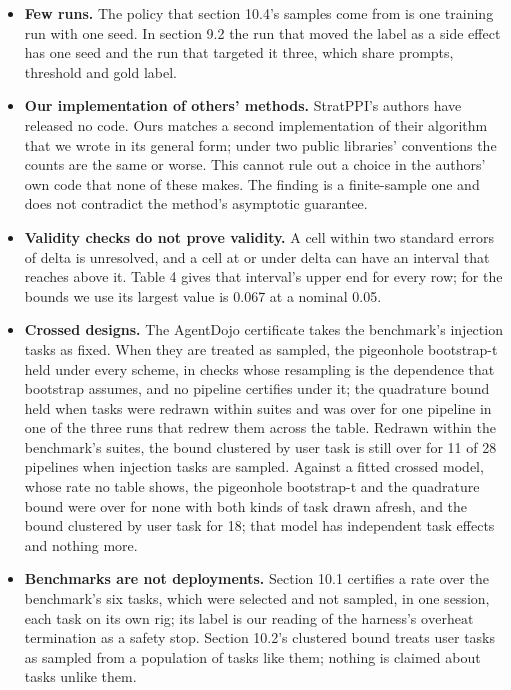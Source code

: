 \documentclass[11pt]{article}
\begin{document}
\begin{itemize}
\item \textbf{Few runs.} The policy that section 10.4's samples come from is one training run with one seed. In section 9.2 the run that moved the label as a side effect has one seed and the run that targeted it three, which share prompts, threshold and gold label.
\item \textbf{Our implementation of others' methods.} StratPPI's authors have released no code. Ours matches a second implementation of their algorithm that we wrote in its general form; under two public libraries' conventions the counts are the same or worse. This cannot rule out a choice in the authors' own code that none of these makes. The finding is a finite-sample one and does not contradict the method's asymptotic guarantee.
\item \textbf{Validity checks do not prove validity.} A cell within two standard errors of delta is unresolved, and a cell at or under delta can have an interval that reaches above it. Table 4 gives that interval's upper end for every row; for the bounds we use its largest value is 0.067 at a nominal 0.05.
\item \textbf{Crossed designs.} The AgentDojo certificate takes the benchmark's injection tasks as fixed. When they are treated as sampled, the pigeonhole bootstrap-t held under every scheme, in checks whose resampling is the dependence that bootstrap assumes, and no pipeline certifies under it; the quadrature bound held when tasks were redrawn within suites and was over for one pipeline in one of the three runs that redrew them across the table. Redrawn within the benchmark's suites, the bound clustered by user task is still over for 11 of 28 pipelines when injection tasks are sampled. Against a fitted crossed model, whose rate no table shows, the pigeonhole bootstrap-t and the quadrature bound were over for none with both kinds of task drawn afresh, and the bound clustered by user task for 18; that model has independent task effects and nothing more.
\item \textbf{Benchmarks are not deployments.} Section 10.1 certifies a rate over the benchmark's six tasks, which were selected and not sampled, in one session, each task on its own rig; its label is our reading of the harness's $\text{overheat}$ termination as a safety stop. Section 10.2's clustered bound treats user tasks as sampled from a population of tasks like them; nothing is claimed about tasks unlike them.

\end{itemize}
\end{document}
